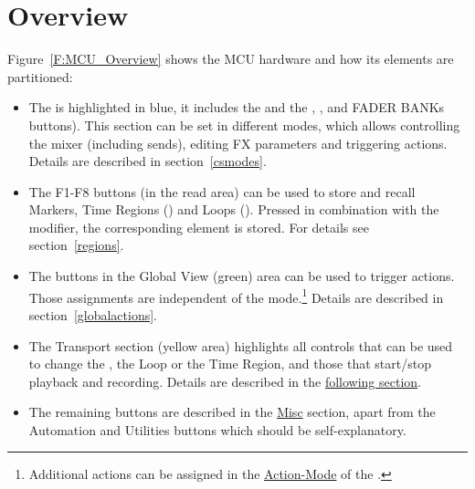 \section{Overview}\label{overview}
\vspace{-5mm}

Figure~\ref{F:MCU_Overview} shows the MCU hardware and how its elements are
partitioned:
\begin{itemize}

\item The \css is highlighted in blue, it includes the \mfader and the
  \flip, \gv, \nv and FADER BANKs buttons). This section can be set in
  different modes, which allows controlling the \reaper mixer
  (including sends), editing FX parameters and triggering \reaper
  actions. Details are described in section~\ref{csmodes}.
 
\item The F1-F8 buttons (in the read area) can be used to store and
  recall Markers, Time Regions (\option) and Loops (\alt). Pressed in
  combination with the \control modifier, the corresponding element is
  stored. For details see section~\ref{regions}.

\item The buttons in the Global View (green) area can be used to
  trigger \reaper actions. Those assignments are independent of the
  \cs mode.\footnote{Additional actions can be assigned in the
    \hyperref[actionmode]{Action-Mode} of the \css.} Details are
  described in section~\ref{globalactions}.

\item The Transport section (yellow area) highlights all controls that
  can be used to change the \ec, the Loop or the Time Region, and
  those that start/stop playback and recording. Details are described
  in the \hyperref[transport]{following section}.

\item The remaining buttons are described in the \hyperref[misc]{Misc}
  section, apart from the Automation and Utilities buttons which should be
  self-explanatory.



\end{itemize}
